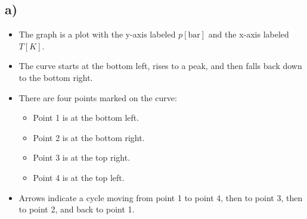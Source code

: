 

\subsection*{a)}

\begin{itemize}
    \item The graph is a plot with the y-axis labeled $p[\text{bar}]$ and the x-axis labeled $T[K]$.
    \item The curve starts at the bottom left, rises to a peak, and then falls back down to the bottom right.
    \item There are four points marked on the curve: 
        \begin{itemize}
            \item Point 1 is at the bottom left.
            \item Point 2 is at the bottom right.
            \item Point 3 is at the top right.
            \item Point 4 is at the top left.
        \end{itemize}
    \item Arrows indicate a cycle moving from point 1 to point 4, then to point 3, then to point 2, and back to point 1.
\end{itemize}